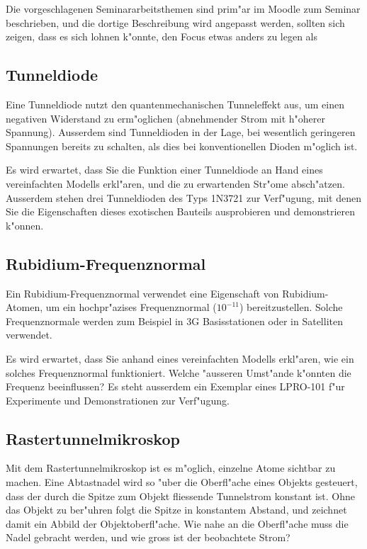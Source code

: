 Die vorgeschlagenen Seminararbeitsthemen sind prim"ar im Moodle zum
Seminar beschrieben, und die dortige Beschreibung wird angepasst
werden, sollten sich zeigen, dass es sich lohnen k"onnte, den Focus
etwas anders zu legen als 

\subsection{Tunneldiode}
Eine Tunneldiode nutzt den quantenmechanischen Tunneleffekt aus,
um einen negativen Widerstand zu erm"oglichen (abnehmender Strom mit
h"oherer Spannung). Ausserdem sind Tunneldioden in der Lage, bei
wesentlich geringeren Spannungen bereits zu schalten, als dies bei
konventionellen Dioden m"oglich ist.

Es wird erwartet, dass Sie die Funktion einer Tunneldiode an Hand
eines vereinfachten Modells erkl"aren, und die zu erwartenden Str"ome
absch"atzen. Ausserdem stehen drei Tunneldioden des Typs 1N3721 zur
Verf"ugung, mit denen Sie die Eigenschaften dieses exotischen Bauteils
ausprobieren und demonstrieren k"onnen.

\subsection{Rubidium-Frequenznormal}
Ein Rubidium-Frequenznormal verwendet eine Eigenschaft von
Rubidium-Atomen, um ein hochpr"azises Frequenznormal ($10^{-11}$)
bereitzustellen. Solche Frequenznormale werden zum Beispiel in 3G
Basisstationen oder in Satelliten verwendet.

Es wird erwartet, dass Sie anhand eines vereinfachten Modells
erkl"aren, wie ein solches Frequenznormal funktioniert. Welche
"ausseren Umst"ande k"onnten die Frequenz beeinflussen? Es steht
ausserdem ein Exemplar eines LPRO-101 f"ur Experimente und Demonstrationen
zur Verf"ugung.

\subsection{Rastertunnelmikroskop}
Mit dem Rastertunnelmikroskop ist es m"oglich, einzelne Atome sichtbar
zu machen. Eine Abtastnadel wird so "uber die Oberfl"ache eines Objekts
gesteuert, dass der durch die Spitze zum Objekt fliessende Tunnelstrom
konstant ist. Ohne das Objekt zu ber"uhren folgt die Spitze in
konstantem Abstand, und zeichnet damit ein Abbild der Objektoberfl"ache.
Wie nahe an die Oberfl"ache muss die Nadel gebracht werden, und wie
gross ist der beobachtete Strom?

